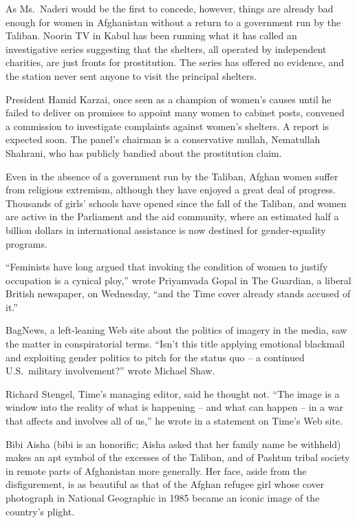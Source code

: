 ﻿\documentclass[12pt]{article}
\begin{document}
As Ms.~Naderi would be the first to concede, however, things are already bad enough for women in
Afghanistan without a return to a government run by the Taliban. Noorin TV in Kabul has been running
what it has called an investigative series suggesting that the shelters, all operated by independent
charities, are just fronts for prostitution. The series has offered no evidence, and the station
never sent anyone to visit the principal shelters.

President Hamid Karzai, once seen as a champion of women's causes until he failed to deliver on
promises to appoint many women to cabinet posts, convened a commission to investigate complaints
against women's shelters. A report is expected soon. The panel's chairman is a conservative mullah,
Nematullah Shahrani, who has publicly bandied about the prostitution claim.

Even in the absence of a government run by the Taliban, Afghan women suffer from religious
extremism, although they have enjoyed a great deal of progress. Thousands of girls' schools have
opened since the fall of the Taliban, and women are active in the Parliament and the aid community,
where an estimated half a billion dollars in international assistance is now destined for
gender-equality programs.

``Feminists have long argued that invoking the condition of women to justify occupation is a cynical
ploy,'' wrote Priyamvada Gopal in The Guardian, a liberal British newspaper, on Wednesday, ``and the
Time cover already stands accused of it.''

BagNews, a left-leaning Web site about the politics of imagery in the media, saw the matter in
conspiratorial terms. ``Isn't this title applying emotional blackmail and exploiting gender politics
to pitch for the status quo -- a continued U.S.~military involvement?'' wrote Michael Shaw.

Richard Stengel, Time's managing editor, said he thought not. ``The image is a window into the
reality of what is happening -- and what can happen -- in a war that affects and involves all of
us,'' he wrote in a statement on Time's Web site.

Bibi Aisha (bibi is an honorific; Aisha asked that her family name be withheld) makes an apt symbol
of the excesses of the Taliban, and of Pashtun tribal society in remote parts of Afghanistan more
generally. Her face, aside from the disfigurement, is as beautiful as that of the Afghan refugee
girl whose cover photograph in National Geographic in 1985 became an iconic image of the country's
plight.
\end{document}
